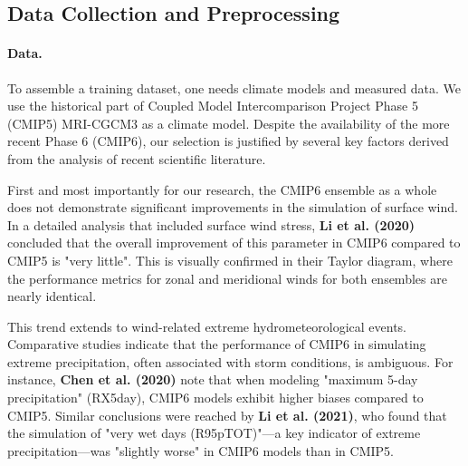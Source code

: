 \documentclass{article}
\begin{document}

\subsection{Data Collection and Preprocessing}
\label{sec:data_collection_preprocessing}

\paragraph {Data.} 
To assemble a training dataset, one needs climate models and measured data. We use the historical part of Coupled Model Intercomparison Project Phase 5 (CMIP5) MRI-CGCM3 \cite{SeijiYukimoto20122012-A02} as a climate model. Despite the availability of the more recent Phase 6 (CMIP6), our selection is justified by several key factors derived from the analysis of recent scientific literature.

First and most importantly for our research, the CMIP6 ensemble as a whole does not demonstrate significant improvements in the simulation of surface wind. In a detailed analysis that included surface wind stress, \textbf{Li et al. (2020)} concluded that the overall improvement of this parameter in CMIP6 compared to CMIP5 is "very little". This is visually confirmed in their Taylor diagram, where the performance metrics for zonal and meridional winds for both ensembles are nearly identical.

This trend extends to wind-related extreme hydrometeorological events. Comparative studies indicate that the performance of CMIP6 in simulating extreme precipitation, often associated with storm conditions, is ambiguous. For instance, \textbf{Chen et al. (2020)} note that when modeling "maximum 5-day precipitation" (RX5day), CMIP6 models exhibit higher biases compared to CMIP5. Similar conclusions were reached by \textbf{Li et al. (2021)}, who found that the simulation of "very wet days (R95pTOT)"—a key indicator of extreme precipitation—was "slightly worse" in CMIP6 models than in CMIP5.
\end{document}
